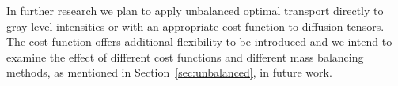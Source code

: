 \documentclass{llncs}
\begin{document}
In further research we plan to apply unbalanced optimal transport directly to
gray level intensities or with an appropriate cost function to diffusion
tensors. The cost function offers additional flexibility to be introduced and
we intend to examine the effect of different cost functions and different mass
balancing methods, as mentioned in Section~\ref{sec:unbalanced}, in future work. 



\end{document}
